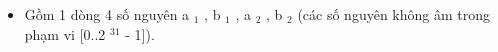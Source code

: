 \begin{itemize}
	\item Gồm 1 dòng 4 số nguyên a $_ 1 $ , b $_ 1 $ , a $_ 2 $ , b $_ 2 $ (các số nguyên không âm trong phạm vi [0..2 $^ 31 $ - 1]).
\end{itemize}